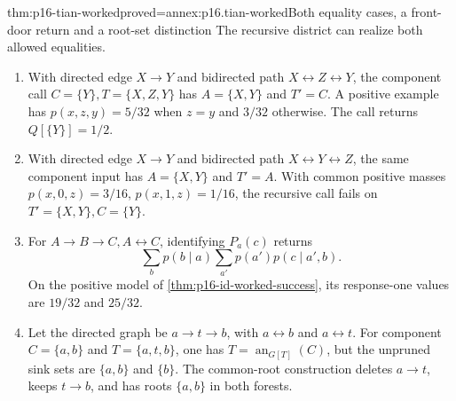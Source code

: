 \begin{hbtheorem}{thm:p16-tian-worked}{proved=annex:p16.tian-worked}{Both equality cases, a front-door return and a root-set distinction}
The recursive district can realize both allowed equalities.
\begin{enumerate}
\item With directed edge \(X\to Y\) and bidirected path
      \(X\leftrightarrow Z\leftrightarrow Y\), the component
      call \(C=\{Y\},T=\{X,Z,Y\}\) has
      \(A=\{X,Y\}\) and \(T'=C\). A positive example has
      \(p(x,z,y)=5/32\) when \(z=y\) and \(3/32\) otherwise.
      The call returns \(Q[\{Y\}]=1/2\).
\item With directed edge \(X\to Y\) and bidirected path
      \(X\leftrightarrow Y\leftrightarrow Z\), the same component
      input has \(A=\{X,Y\}\) and \(T'=A\). With common
      positive masses \(p(x,0,z)=3/16\), \(p(x,1,z)=1/16\),
      the recursive call fails on \(T'=\{X,Y\},C=\{Y\}\).
\item For \(A\to B\to C,A\leftrightarrow C\), identifying
      \(P_a(c)\) returns
      \[
       \sum_b p(b\mid a)\sum_{a'}p(a')p(c\mid a',b).
      \]
      On the positive model of \cref{thm:p16-id-worked-success},
      its response-one values are \(19/32\) and \(25/32\).
\item Let the directed graph be \(a\to t\to b\), with
      \(a\leftrightarrow b\) and \(a\leftrightarrow t\).
      For component \(C=\{a,b\}\) and \(T=\{a,t,b\}\),
      one has \(T=\operatorname{an}_{G[T]}(C)\), but the
      unpruned sink sets are \(\{a,b\}\) and \(\{b\}\).
      The common-root construction deletes \(a\to t\), keeps
      \(t\to b\), and has roots \(\{a,b\}\) in both forests.
\end{enumerate}
\end{hbtheorem}

